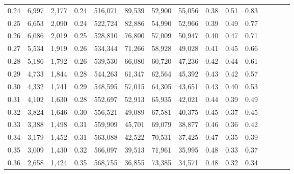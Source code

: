 \begin{tabular}{rrrcrrrrrrrrrrr}
0.24 &   6,997 &  2,177 &                                       0.24 &  516,071 &   89,539 &   52,900 &   55,056 &  0.38 &  0.51 &                         0.83 \\
0.25 &   6,653 &  2,090 &                                       0.24 &  522,724 &   82,886 &   54,990 &   52,966 &  0.39 &  0.49 &                         0.77 \\
0.26 &   6,086 &  2,019 &                                       0.25 &  528,810 &   76,800 &   57,009 &   50,947 &  0.40 &  0.47 &                         0.71 \\
0.27 &   5,534 &  1,919 &                                       0.26 &  534,344 &   71,266 &   58,928 &   49,028 &  0.41 &  0.45 &                         0.66 \\
0.28 &   5,186 &  1,792 &                                       0.26 &  539,530 &   66,080 &   60,720 &   47,236 &  0.42 &  0.44 &                         0.61 \\
0.29 &   4,733 &  1,844 &                                       0.28 &  544,263 &   61,347 &   62,564 &   45,392 &  0.43 &  0.42 &                         0.57 \\
0.30 &   4,332 &  1,741 &                                       0.29 &  548,595 &   57,015 &   64,305 &   43,651 &  0.43 &  0.40 &                         0.53 \\
0.31 &   4,102 &  1,630 &                                       0.28 &  552,697 &   52,913 &   65,935 &   42,021 &  0.44 &  0.39 &                         0.49 \\
0.32 &   3,824 &  1,646 &                                       0.30 &  556,521 &   49,089 &   67,581 &   40,375 &  0.45 &  0.37 &                         0.45 \\
0.33 &   3,388 &  1,498 &                                       0.31 &  559,909 &   45,701 &   69,079 &   38,877 &  0.46 &  0.36 &                         0.42 \\
0.34 &   3,179 &  1,452 &                                       0.31 &  563,088 &   42,522 &   70,531 &   37,425 &  0.47 &  0.35 &                         0.39 \\
0.35 &   3,009 &  1,430 &                                       0.32 &  566,097 &   39,513 &   71,961 &   35,995 &  0.48 &  0.33 &                         0.37 \\
0.36 &   2,658 &  1,424 &                                       0.35 &  568,755 &   36,855 &   73,385 &   34,571 &  0.48 &  0.32 &                         0.34 \\

\end{tabular}
